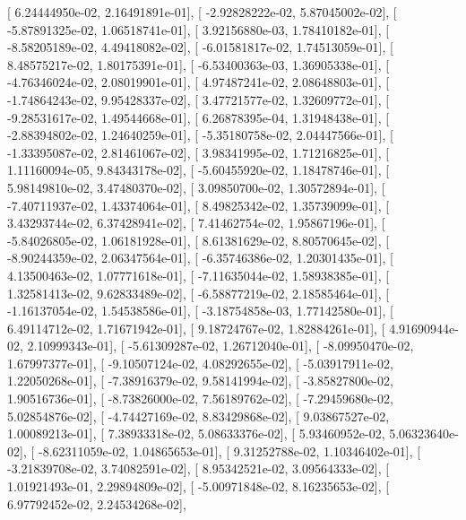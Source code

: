 \documentclass{article}
\begin{document}
       [  6.24444950e-02,   2.16491891e-01],
       [ -2.92828222e-02,   5.87045002e-02],
       [ -5.87891325e-02,   1.06518741e-01],
       [  3.92156880e-03,   1.78410182e-01],
       [ -8.58205189e-02,   4.49418082e-02],
       [ -6.01581817e-02,   1.74513059e-01],
       [  8.48575217e-02,   1.80175391e-01],
       [ -6.53400363e-03,   1.36905338e-01],
       [ -4.76346024e-02,   2.08019901e-01],
       [  4.97487241e-02,   2.08648803e-01],
       [ -1.74864243e-02,   9.95428337e-02],
       [  3.47721577e-02,   1.32609772e-01],
       [ -9.28531617e-02,   1.49544668e-01],
       [  6.26878395e-04,   1.31948438e-01],
       [ -2.88394802e-02,   1.24640259e-01],
       [ -5.35180758e-02,   2.04447566e-01],
       [ -1.33395087e-02,   2.81461067e-02],
       [  3.98341995e-02,   1.71216825e-01],
       [  1.11160094e-05,   9.84343178e-02],
       [ -5.60455920e-02,   1.18478746e-01],
       [  5.98149810e-02,   3.47480370e-02],
       [  3.09850700e-02,   1.30572894e-01],
       [ -7.40711937e-02,   1.43374064e-01],
       [  8.49825342e-02,   1.35739099e-01],
       [  3.43293744e-02,   6.37428941e-02],
       [  7.41462754e-02,   1.95867196e-01],
       [ -5.84026805e-02,   1.06181928e-01],
       [  8.61381629e-02,   8.80570645e-02],
       [ -8.90244359e-02,   2.06347564e-01],
       [ -6.35746386e-02,   1.20301435e-01],
       [  4.13500463e-02,   1.07771618e-01],
       [ -7.11635044e-02,   1.58938385e-01],
       [  1.32581413e-02,   9.62833489e-02],
       [ -6.58877219e-02,   2.18585464e-01],
       [ -1.16137054e-02,   1.54538586e-01],
       [ -3.18754858e-03,   1.77142580e-01],
       [  6.49114712e-02,   1.71671942e-01],
       [  9.18724767e-02,   1.82884261e-01],
       [  4.91690944e-02,   2.10999343e-01],
       [ -5.61309287e-02,   1.26712040e-01],
       [ -8.09950470e-02,   1.67997377e-01],
       [ -9.10507124e-02,   4.08292655e-02],
       [ -5.03917911e-02,   1.22050268e-01],
       [ -7.38916379e-02,   9.58141994e-02],
       [ -3.85827800e-02,   1.90516736e-01],
       [ -8.73826000e-02,   7.56189762e-02],
       [ -7.29459680e-02,   5.02854876e-02],
       [ -4.74427169e-02,   8.83429868e-02],
       [  9.03867527e-02,   1.00089213e-01],
       [  7.38933318e-02,   5.08633376e-02],
       [  5.93460952e-02,   5.06323640e-02],
       [ -8.62311059e-02,   1.04865653e-01],
       [  9.31252788e-02,   1.10346402e-01],
       [ -3.21839708e-02,   3.74082591e-02],
       [  8.95342521e-02,   3.09564333e-02],
       [  1.01921493e-01,   2.29894809e-02],
       [ -5.00971848e-02,   8.16235653e-02],
       [  6.97792452e-02,   2.24534268e-02],
\end{document}
